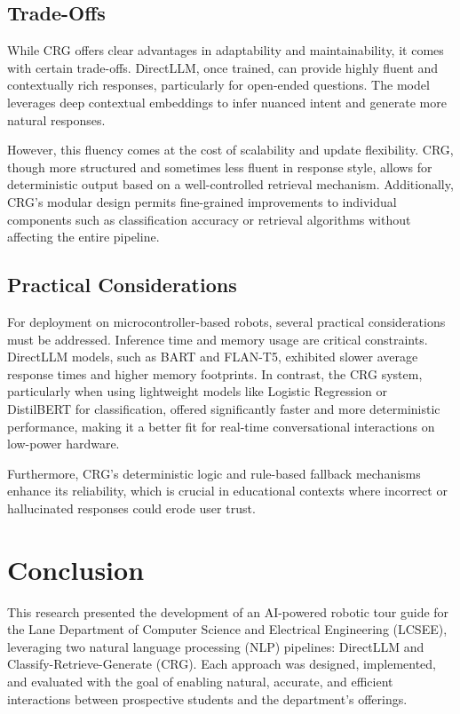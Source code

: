\documentclass[conference]{IEEEtran}
\begin{document}
\subsection{Trade-Offs}
While CRG offers clear advantages in adaptability and maintainability, it comes with certain trade-offs. 
DirectLLM, once trained, can provide highly fluent and contextually rich responses, particularly for open-ended questions. 
The model leverages deep contextual embeddings to infer nuanced intent and generate more natural responses.

However, this fluency comes at the cost of scalability and update flexibility. 
CRG, though more structured and sometimes less fluent in response style, allows for deterministic output based on a well-controlled retrieval mechanism. 
Additionally, CRG's modular design permits fine-grained improvements to individual components such as classification accuracy or retrieval algorithms without affecting the entire pipeline.

\subsection{Practical Considerations}
For deployment on microcontroller-based robots, several practical considerations must be addressed. 
Inference time and memory usage are critical constraints. 
DirectLLM models, such as BART and FLAN-T5, exhibited slower average response times and higher memory footprints. 
In contrast, the CRG system, particularly when using lightweight models like Logistic Regression or DistilBERT for classification, offered significantly faster and more deterministic performance, making it a better fit for real-time conversational interactions on low-power hardware.

Furthermore, CRG's deterministic logic and rule-based fallback mechanisms enhance its reliability, which is crucial in educational contexts where incorrect or hallucinated responses could erode user trust.

\section{Conclusion}
This research presented the development of an AI-powered robotic tour guide for the Lane Department of Computer Science and Electrical Engineering (LCSEE), leveraging two natural language processing (NLP) pipelines: DirectLLM and Classify-Retrieve-Generate (CRG). 
Each approach was designed, implemented, and evaluated with the goal of enabling natural, accurate, and efficient interactions between prospective students and the department's offerings.
\end{document}
